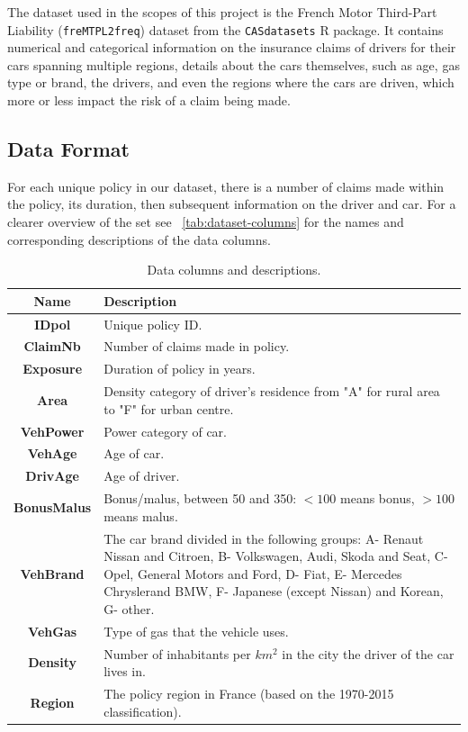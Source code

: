 The dataset used in the scopes of this project is the French Motor Third-Part Liability (\texttt{freMTPL2freq}) dataset from the \texttt{CASdatasets} \cite[p.~71]{CASdatasets} R package. It contains numerical and categorical information on the insurance claims of drivers for their cars spanning multiple regions, details about the cars themselves, such as age, gas type or brand, the drivers, and even the regions where the cars are driven, which more or less impact the risk of a claim being made.

\subsection{Data Format}
For each unique policy in our dataset, there is a number of claims made within the policy, its duration, then subsequent information on the driver and car. For a clearer overview of the set see ~\autoref{tab:dataset-columns} for the names and corresponding descriptions of the data columns.

\begin{table} [h!]
    \centering
    \caption{Data columns and descriptions.}
    \begin{tabularx}{\linewidth}{|c|X|}
        \hline
        \textbf{Name} & \textbf{Description} \\
        \hline \hline
        \textbf{IDpol} & Unique policy ID. \\ 
        \hline
        \textbf{ClaimNb} & Number of claims made in policy. \\
        \hline
        \textbf{Exposure} & Duration of policy in years. \\
        \hline
        \textbf{Area} & Density category of driver's residence from "A" for rural area to "F" for urban centre. \\ 
        \hline
        \textbf{VehPower} & Power category of car. \\
        \hline
        \textbf{VehAge} & Age of car. \\
        \hline
        \textbf{DrivAge} & Age of driver. \\
        \hline
        \textbf{BonusMalus} & Bonus/malus, between 50 and 350: $<100$ means bonus, $>100$ means malus. \\
        \hline
        \textbf{VehBrand} & The car brand divided in the following groups: A- Renaut Nissan and Citroen, B- Volkswagen, Audi, Skoda and Seat, C- Opel, General Motors and Ford, D- Fiat, E- Mercedes Chryslerand BMW, F- Japanese (except Nissan) and Korean, G- other. \\
        \hline
        \textbf{VehGas} & Type of gas that the vehicle uses. \\
        \hline
        \textbf{Density} & Number of inhabitants per $km^2$ in the city the driver of the car lives in. \\
        \hline
        \textbf{Region} & The policy region in France (based on the 1970-2015 classification). \\
        \hline
    \end{tabularx}
    \label{tab:dataset-columns}
\end{table}

